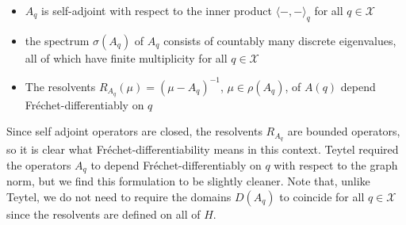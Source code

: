 \begin{itemize}
    \item $A_q$ is self-adjoint with respect to the inner product $\langle-,-\rangle_q$ for all $q\in\mathcal{X}$
    \item the spectrum $\sigma(A_q)$ of $A_q$ consists of countably many discrete eigenvalues, all of which have finite multiplicity for all $q\in\mathcal{X}$
    \item The resolvents $R_{A_q}(\mu)=(\mu-A_q)^{-1}$, $\mu\in\rho(A_q)$, of $A(q)$ depend Fr\'echet-differentiably on $q$ 
\end{itemize}

\begin{rmk}
    Since self adjoint operators are closed, the resolvents $R_{A_q}$ are bounded operators, so it is clear what Fr\'echet-differentiability means in this context. Teytel required the operators $A_q$ to depend Fr\'echet-differentiably on $q$ with respect to the graph norm, but we find this formulation to be slightly cleaner. Note that, unlike Teytel, we do not need to require the domains $D(A_q)$ to coincide for all $q\in \mathcal{X}$ since the resolvents are defined on all of $H$.
\end{rmk}

